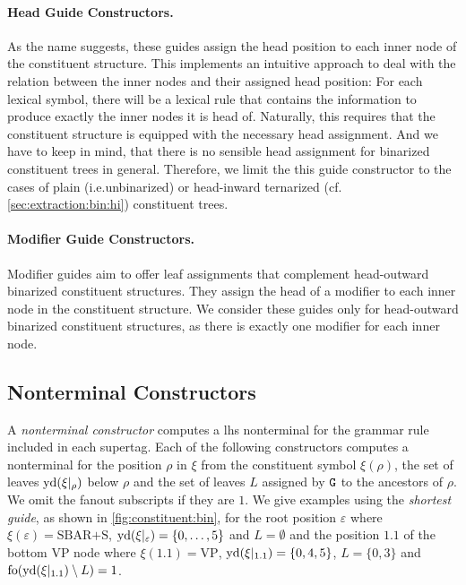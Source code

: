 \documentclass[../document.tex]{subfiles}
\begin{document}
    \paragraph{Head Guide Constructors.}
    As the name suggests, these guides assign the head position to each inner node of the constituent structure.
    This implements an intuitive approach to deal with the relation between the inner nodes and their assigned head position: For each lexical symbol, there will be a lexical rule that contains the information to produce exactly the inner nodes it is head of.
    Naturally, this requires that the constituent structure is equipped with the necessary head assignment.
    And we have to keep in mind, that there is no sensible head assignment for binarized constituent trees in general.
    Therefore, we limit the this guide constructor to the cases of plain (i.e.\@ unbinarized) or head-inward ternarized (cf.\@ \cref{sec:extraction:bin:hi}) constituent trees.

    \paragraph{Modifier Guide Constructors.}
    Modifier guides aim to offer leaf assignments that complement head-outward binarized constituent structures.
    They assign the head of a modifier to each inner node in the constituent structure.
    We consider these guides only for head-outward binarized constituent structures, as there is exactly one modifier for each inner node.

    \subsection{Nonterminal Constructors}
    A \emph{nonterminal constructor} computes a lhs nonterminal for the grammar rule included in each supertag.
    Each of the following constructors computes a nonterminal for the position \(\rho\) in \(\xi\) from the constituent symbol \(\xi(\rho)\), the set of leaves \(\operatorname{yd}(\xi|_\rho)\) below \(\rho\) and the set of leaves \(L\) assigned by \(\texttt{G}\) to the ancestors of \(\rho\).
    We omit the fanout subscripts if they are \(1\).
    We give examples using the \emph{shortest guide}, as shown in \cref{fig:constituent:bin}, for the root position \(\varepsilon\) where \(\xi(\varepsilon) = \text{SBAR+S}\), \(\operatorname{yd}(\xi|_\varepsilon) = \{0,\ldots,5\}\) and \(L = \emptyset\) and the position \(1.1\) of the bottom VP node where \(\xi(1.1) = \text{VP}\), \(\operatorname{yd}(\xi|_{1.1}) = \{0,4,5\}\), \(L = \{0,3\}\) and \(\operatorname{fo}(\operatorname{yd}(\xi|_{1.1}) \setminus L) = 1\).
\end{document}

